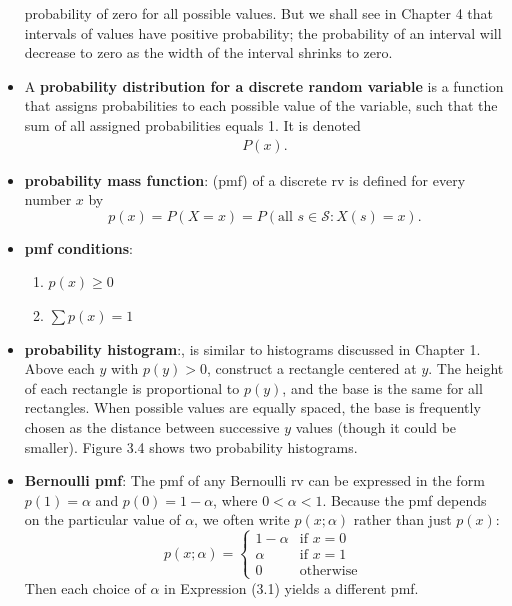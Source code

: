 \documentclass{report}
\begin{document}
\begin{itemize}
probability of zero for all possible values. But we shall see in Chapter 4 that intervals of values have positive probability; the probability of an interval will decrease
to zero as the width of the interval shrinks to zero.
\item 
    A \textbf{probability distribution for a discrete random variable} is a function that assigns probabilities to each possible value of the variable, such that the sum of all assigned probabilities equals 1. It is denoted 
    \begin{align*}
        P(x)
    .\end{align*}
    \item \textbf{probability mass function}: (pmf) of a discrete rv is defined for every number \( x \) by
    \[
    p(x) = P(X = x) = P(\text{all } s \in \mathcal{S} : X(s) = x).
    \]
\item \textbf{pmf conditions}:
    \begin{enumerate}
        \item $p(x)  \geq 0 $
        \item $\sum p(x) = 1 $
    \end{enumerate}
    \item \textbf{probability histogram}:, is similar to histograms discussed in Chapter 1. Above each \( y \) with \( p(y) > 0 \), construct a rectangle centered at \( y \). The height of each rectangle is proportional to \( p(y) \), and the base is the same for all rectangles. When possible values are equally spaced, the base is frequently chosen as the distance between successive \( y \) values (though it could be smaller). Figure 3.4 shows two probability histograms.
        \bigbreak \noindent 
    \item \textbf{Bernoulli pmf}: The pmf of any Bernoulli rv can be expressed in the form \( p(1) = \alpha \) and \( p(0) = 1 - \alpha \), where \( 0 < \alpha < 1 \). Because the pmf depends on the particular value of \( \alpha \), we often write \( p(x; \alpha) \) rather than just \( p(x) \):
        \[
            p(x; \alpha) = 
            \begin{cases} 
                1 - \alpha & \text{if } x = 0 \\
                \alpha & \text{if } x = 1 \quad \tag{3.1} \\
                0 & \text{otherwise}
            \end{cases}
        \]
        Then each choice of \( \alpha \) in Expression (3.1) yields a different pmf.

\end{itemize}
\end{document}
